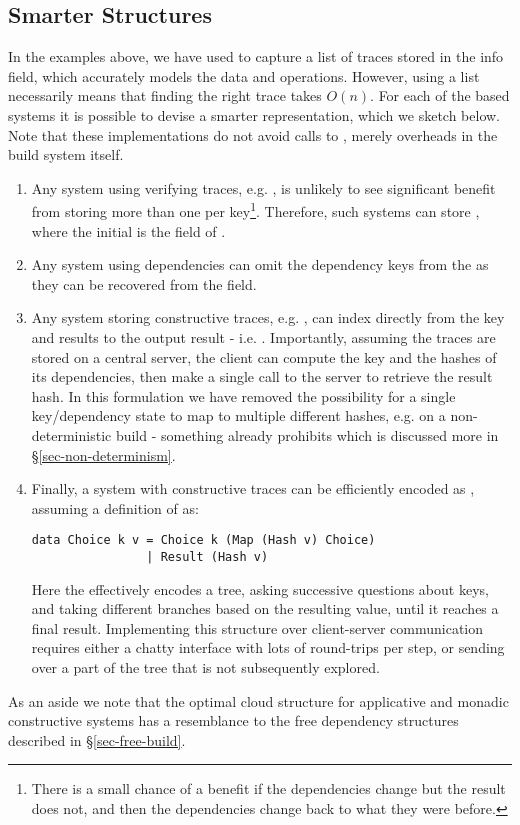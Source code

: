 \subsection{Smarter \hs{[Trace]} Structures}\label{sec-smart-traces}

In the examples above, we have used \hs{[Trace]} to capture a list of traces stored in the info field, which accurately models the data and operations. However, using a list necessarily means that finding the right trace takes $O(n)$. For each of the  based systems it is possible to devise a smarter representation, which we sketch below. Note that these implementations do not avoid calls to , merely overheads in the build system itself.

\begin{enumerate}
\item Any system using verifying traces, e.g. \Shake, is unlikely to see significant benefit from storing more than one  per key\footnote{There is a small chance of a benefit if the dependencies change but the result does not, and then the dependencies change back to what they were before.}. Therefore, such systems can store , where the initial  is the  field of .
\item Any system using  dependencies can omit the dependency keys from the  as they can be recovered from the  field.
\item Any  system storing constructive traces, e.g. \Bazel, can index directly from the key and results to the output result - i.e. . Importantly, assuming the traces are stored on a central server, the client can compute the key and the hashes of its dependencies, then make a single call to the server to retrieve the result hash. In this formulation we have removed the possibility for a single key/dependency state to map to multiple different hashes, e.g. on a non-deterministic build - something \Bazel already prohibits which is discussed more in \S\ref{sec-non-determinism}.
\item Finally, a  system with constructive traces can be efficiently encoded as , assuming a definition of  as:
\begin{verbatim}
data Choice k v = Choice k (Map (Hash v) Choice)
                | Result (Hash v)
\end{verbatim}
Here the  effectively encodes a tree, asking successive questions about keys, and taking different branches based on the resulting value, until it reaches a final result. Implementing this structure over client-server communication requires either a chatty interface with lots of round-trips per  step, or sending over a part of the tree that is not subsequently explored.
\end{enumerate}

As an aside we note that the optimal cloud structure for applicative and monadic constructive systems has a resemblance to the free dependency structures described in \S\ref{sec-free-build}.

